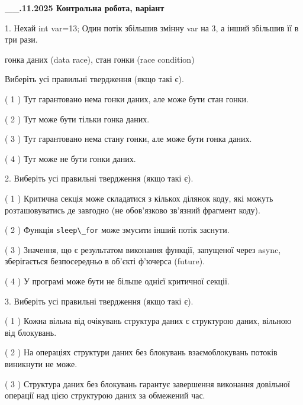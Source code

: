 \documentclass[12pt, ukrainian]{article}
\def\code#1{\Verb!#1!}
\begin{document}
\newpage
\begin {large}

\textbf{\_\_.11.2025 Контрольна робота, варіант  }\par


{
1. Нехай int var=13; Один потік збільшив змінну var на 3, а інший збільшив її в три рази.

гонка даних (data race), стан гонки (race condition)

Виберіть усі правильні твердження (якщо такі є).\par
\vspace{2mm}
( 1 ) Тут гарантовано нема гонки даних, але може бути стан гонки.%

( 2 ) Тут може бути тільки гонка даних.%

( 3 ) Тут гарантовано нема стану гонки, але може бути гонка даних.%

( 4 ) Тут може не бути гонки даних.%


2. Виберіть усі правильні твердження (якщо такі є).\par
\vspace{2mm}

( 1 ) Критична секція може складатися з кількох ділянок коду, які можуть розташовуватись де завгодно (не обов’язково зв’язний фрагмент коду).%

( 2 ) Функція \code{sleep\_for} може змусити інший потік заснути.%

( 3 ) Значення, що є результатом виконання функції, запущеної через async, зберігається безпосередньо в об’єкті ф’ючерса (future).%

( 4 ) У програмі може бути не більше однієї критичної секції.%


3. Виберіть усі правильні твердження (якщо такі є).\par
\vspace{2mm}

( 1 ) Кожна вільна від очікувань структура даних є структурою даних, вільною від блокувань.%

( 2 ) На операціях структури даних без блокувань взаємоблокувань потоків виникнути не може.%

( 3 ) Структура даних без блокувань гарантує завершення виконання довільної операції над цією структурою даних за обмежений час.%

}
\end{large}
\end{document}
